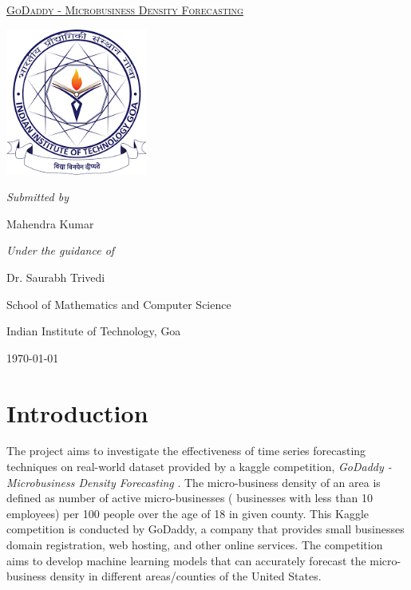 \documentclass{article}
\begin{document}
\begin{titlepage}
	\centering
	{\scshape\Large \uline{\hspace{12cm}}\par}
	{\scshape\Large \uline{GoDaddy - Microbusiness Density Forecasting}\par}
	\vspace{1cm}
	\includegraphics[width=0.35\textwidth]{images/iitgoa-logo.png}\par\vspace{1cm}
	\vspace{1cm}
	{\Large\itshape Submitted by\par}
	\vspace{0.5cm}
	{\Large Mahendra Kumar\par}
	\vspace{1cm}
	{\Large\itshape Under the guidance of \par}
	\vspace{0.5cm}
	{\Large Dr. Saurabh Trivedi\par}
	\vspace{2cm}
	{\Large School of Mathematics and Computer Science\par}
	\vspace{0.5cm}
	{\Large Indian Institute of Technology, Goa\par}
	\vfill
	{\large \today\par}
\end{titlepage}
\renewcommand\contentsname{Table of Contents\vspace{1cm}}
\begin{center}
	\tableofcontents
\end{center}
\cftsetpnumwidth{2em}
\newpage

\section{\centering Introduction}
\vspace{1em}
The project aims to investigate the effectiveness of time series forecasting techniques on real-world dataset provided by a kaggle competition, \textit{GoDaddy - Microbusiness Density Forecasting} \cite{kaggle_competition} . The micro-business density of an area is defined as number of active micro-businesses ( businesses with less than 10 employees) per 100 people over the age of 18 in given county. This Kaggle competition is conducted by GoDaddy, a company that provides small businesses domain registration, web hosting, and other online services. The competition aims to develop machine learning models that can accurately forecast the micro-business density in different areas/counties of the United States. 
\end{document}
